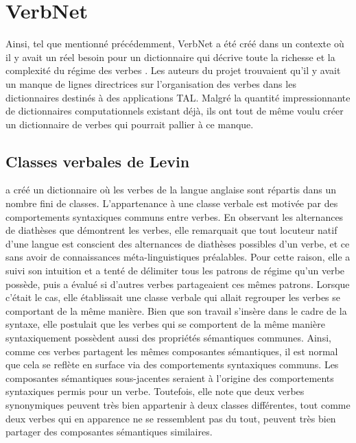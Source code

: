 \section{VerbNet}

Ainsi, tel que mentionné précédemment, VerbNet a été créé dans un contexte où il y avait un réel besoin pour un dictionnaire qui décrive toute la richesse et la complexité du régime des verbes \citep{KipperClassBasedConstructionVerb2000}. Les auteurs du projet trouvaient qu'il y avait un manque de lignes directrices sur l'organisation des verbes dans les dictionnaires destinés à des applications TAL. Malgré la quantité impressionnante de dictionnaires computationnels existant déjà, ils ont tout de même voulu créer un dictionnaire de verbes qui pourrait pallier à ce manque. 

\subsection{Classes verbales de Levin}

\cite{verb-classes.levin.1993} a créé un dictionnaire où les verbes de la langue anglaise sont répartis dans un nombre fini de classes. L'appartenance à une classe verbale est motivée par des comportements syntaxiques communs entre verbes. En observant les alternances de diathèses que démontrent les verbes, elle remarquait que tout locuteur natif d'une langue est conscient des alternances de diathèses possibles d'un verbe, et ce sans avoir de connaissances méta-linguistiques préalables. Pour cette raison, elle a suivi son intuition et a tenté de délimiter tous les patrons de régime qu'un verbe possède, puis a évalué si d'autres verbes partageaient ces mêmes patrons. Lorsque c'était le cas, elle établissait une classe verbale qui allait regrouper les verbes se comportant de la même manière. Bien que son travail s'insère dans le cadre de la syntaxe, elle postulait que les verbes qui se comportent de la même manière syntaxiquement possèdent aussi des propriétés sémantiques communes. Ainsi, comme ces verbes partagent les mêmes composantes sémantiques, il est normal que cela se reflète en surface via des comportements syntaxiques communs. Les composantes sémantiques sous-jacentes seraient à l'origine des comportements syntaxiques permis pour un verbe. Toutefois, elle note que deux verbes synonymiques peuvent très bien appartenir à deux classes différentes, tout comme deux verbes qui en apparence ne se ressemblent pas du tout, peuvent très bien partager des composantes sémantiques similaires.

